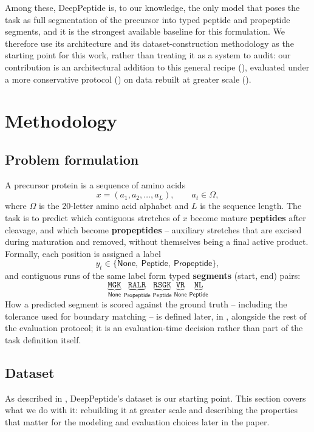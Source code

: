 \documentclass{article}
\begin{document}
Among these, DeepPeptide is, to our knowledge, the only model that poses the task as full segmentation of the precursor into typed peptide and propeptide segments, and it is the strongest available baseline for this formulation. We therefore use its architecture and its dataset-construction methodology as the starting point for this work, rather than treating it as a system to audit: our contribution is an architectural addition to this general recipe (), evaluated under a more conservative protocol () on data rebuilt at greater scale ().

\section{Methodology}
\label{sec:method}

\subsection{Problem formulation}
\label{sec:problem}

A precursor protein is a sequence of amino acids
$$ x = (a_1, a_2, \dots, a_L), \qquad a_t \in \Omega, $$
where $\Omega$ is the 20-letter amino acid alphabet and $L$ is the sequence length. The task is to predict which contiguous stretches of $x$ become mature \textbf{peptides} after cleavage, and which become \textbf{propeptides} -- auxiliary stretches that are excised during maturation and removed, without themselves being a final active product. Formally, each position is assigned a label
$$ y_t \in \{\textsf{None},\ \textsf{Peptide},\ \textsf{Propeptide}\}, $$
and contiguous runs of the same label form typed \textbf{segments} (start, end) pairs:
$$
\underbrace{\texttt{MGK}}_{\textsf{None}}\;
\underbrace{\texttt{RALR}}_{\textsf{Propeptide}}\;
\underbrace{\texttt{RSGK}}_{\textsf{Peptide}}\;
\underbrace{\texttt{VR}}_{\textsf{None}}\;
\underbrace{\texttt{NL}}_{\textsf{Peptide}}
$$
How a predicted segment is scored against the ground truth -- including the tolerance used for boundary matching -- is defined later, in , alongside the rest of the evaluation protocol; it is an evaluation-time decision rather than part of the task definition itself.

\subsection{Dataset}
\label{sec:dataset}

As described in , DeepPeptide's dataset is our starting point. This section covers what we do with it: rebuilding it at greater scale and describing the properties that matter for the modeling and evaluation choices later in the paper.
\end{document}
